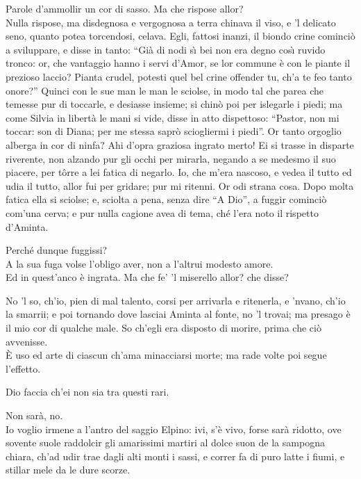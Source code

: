 \documentclass{book}
\begin{document}
	\9 Parole d'ammollir un cor di sasso.
	Ma che rispose allor? \\

   \5 Nulla rispose,
	ma disdegnosa e vergognosa a terra
	chinava il viso, e 'l delicato seno,
	quanto potea torcendosi, celava.
	Egli, fattosi inanzi, il biondo crine
	cominci\`o a sviluppare, e disse in tanto:
	``Gi\`a di nodi s\`{\i} bei non era degno
	cos\`{\i} ruvido tronco: or, che vantaggio
	hanno i servi d'Amor, se lor commune
	\`e con le piante il prezioso laccio?
	Pianta crudel, potesti quel bel crine
	offender tu, ch'a te feo tanto onore?''
	Quinci con le sue man le man le sciolse,
	in modo tal che parea che temesse
	pur di toccarle, e desiasse insieme;
	si chin\`o poi per islegarle i piedi;
	ma come Silvia in libert\`a le mani
	si vide, disse in atto dispettoso:
	``Pastor, non mi toccar: son di Diana;
	per me stessa sapr\`o sciogliermi i piedi''.
	\9 Or tanto orgoglio alberga in cor di ninfa?
	Ahi d'opra graziosa ingrato merto!
	\5 Ei si trasse in disparte riverente,
	non alzando pur gli occhi per mirarla,
	negando a se medesmo il suo piacere,
	per t\^orre a lei fatica di negarlo.
	Io, che m'era nascoso, e vedea il tutto
	ed udia il tutto, allor fui per gridare;
	pur mi ritenni. Or odi strana cosa.
	Dopo molta fatica ella si sciolse;
	e, sciolta a pena, senza dire ``A Dio'',
	a fuggir cominci\`o com'una cerva;
	e pur nulla cagione avea di tema,
	ch\'e l'era noto il rispetto d'Aminta.

	\9 Perch\'e dunque fuggissi? \\

   \5 A la sua fuga
	volse l'obligo aver, non a l'altrui
	modesto amore. \\

   \9 Ed in quest'anco \`e ingrata.
	Ma che fe' 'l miserello allor? che disse?

	\5 No 'l so, ch'io, pien di mal talento, corsi
	per arrivarla e ritenerla, e 'nvano,
	ch'io la smarrii; e poi tornando dove
	lasciai Aminta al fonte, no 'l trovai;
	ma presago \`e il mio cor di qualche male.
	So ch'egli era disposto di morire,
	prima che ci\`o avvenisse. \\

   \9 \`E uso ed arte
	di ciascun ch'ama minacciarsi morte;
	ma rade volte poi segue l'effetto.

	\5 Dio faccia ch'ei non sia tra questi rari.

	\9 Non sar\`a, no. \\

   \5 Io voglio irmene a l'antro
	del saggio Elpino: ivi, s'\`e vivo, forse
	sar\`a ridotto, ove sovente suole
	raddolcir gli amarissimi martiri
	al dolce suon de la sampogna chiara,
	ch'ad udir trae dagli alti monti i sassi,
	e correr fa di puro latte i fiumi,
	e stillar mele da le dure scorze.
\end{document}
